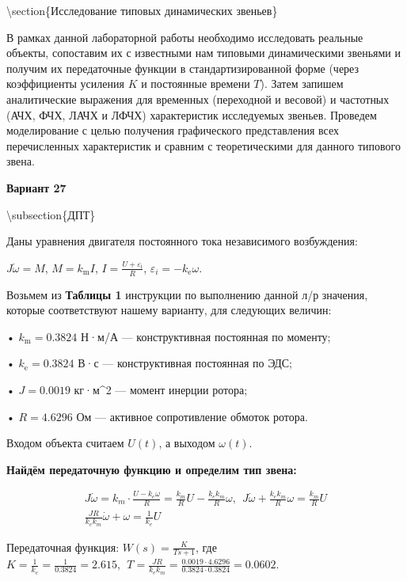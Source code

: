 



\textbackslash{}section\{Исследование типовых динамических звеньев\}

В рамках данной лабораторной работы необходимо исследовать реальные объекты, сопоставим их с известными нам типовыми динамическими звеньями и получим их передаточные функции в стандартизированной форме (через коэффициенты усиления $K$ и постоянные времени $T$). Затем запишем аналитические выражения для временных (переходной и весовой) и частотных (АЧХ, ФЧХ, ЛАЧХ и ЛФЧХ) характеристик исследуемых звеньев. Проведем моделирование с целью получения графического представления всех перечисленных характеристик и сравним с теоретическими для данного типового звена.

\textbf{Вариант 27}

\textbackslash{}subsection\{ДПТ\}

Даны уравнения двигателя постоянного тока независимого возбуждения:

$J\dot{\omega} =M$, $M=k_{\text{m}} I$, $I=\frac{U+\varepsilon_{\text{i}} }{R}$, $\varepsilon_i =-k_{\text{e}} \omega$.

Возьмем из \textbf{Таблицы 1} инструкции по выполнению данной л/р значения, которые соответствуют нашему варианту, для следующих величин:

• $k_{\text{m}} =0.3824$ Н·м/А — конструктивная постоянная по моменту;

• $k_{\text{e}} =0.3824$ В·с — конструктивная постоянная по ЭДС;

• $J=0.0019$ кг·м\textasciicircum{}2 — момент инерции ротора;

• $R=4.6296$ Ом — активное сопротивление обмоток ротора.

Входом объекта считаем $U(t)$, а выходом $\omega (t)$.

\textbf{Найдём передаточную функцию и определим тип звена:}

\begin{par}
$$\begin{array}{l}
J\dot{\omega} =k_m \cdot \frac{U-k_e \omega }{R}=\frac{k_m }{R}U-\frac{k_e k_m }{R}\omega ,~~J\dot{\omega} +\frac{k_e k_m }{R}\omega =\frac{k_m }{R}U\\
\frac{JR}{k_e k_m }\dot{\omega} +\omega =\frac{1}{k_e }U
\end{array}$$
\end{par}

Передаточная функция: $W(s)=\frac{K}{Ts+1}$, где $K=\frac{1}{k_e }=\frac{1}{0.3824}=2.615,~~T=\frac{JR}{k_e k_m }=\frac{0.0019\cdot 4.6296}{0.3824\cdot 0.3824}=0.0602$.

